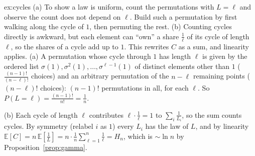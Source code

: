 \begin{solution}{ex:cycles}
\idea (a) To show a law is uniform, count the permutations with $L=\ell$ and observe the count does not depend on $\ell$. Build such a permutation by first walking along the cycle of $1$, then permuting the rest. (b) Counting cycles directly is awkward, but each element can ``own'' a share $\frac1\ell$ of its cycle of length $\ell$, so the shares of a cycle add up to $1$. This rewrites $C$ as a sum, and linearity applies.
\writeup (a) A permutation whose cycle through $1$ has length $\ell$ is given by the ordered list $\sigma(1),\sigma^2(1),\dots,\sigma^{\ell-1}(1)$ of distinct elements other than $1$
($\frac{(n-1)!}{(n-\ell)!}$ choices) and an arbitrary permutation of the $n-\ell$ remaining points ($(n-\ell)!$ choices): $(n-1)!$ permutations in all, for each $\ell$. So $P(L=\ell)=\frac{(n-1)!}{n!}=\frac1n$.

(b) Each cycle of length $\ell$ contributes $\ell\cdot\frac1\ell=1$ to $\sum_i\frac1{L_i}$, so the sum counts cycles. By symmetry (relabel $i$ as $1$) every $L_i$ has the law of $L$, and by linearity
$\mathbb E[C]=n\,\mathbb E\left[\frac1L\right]=n\cdot\frac1n\sum_{\ell=1}^n\frac1\ell=H_n$, which is $\sim\ln n$ by Proposition~\ref{prop:gamma}.
\end{solution}

